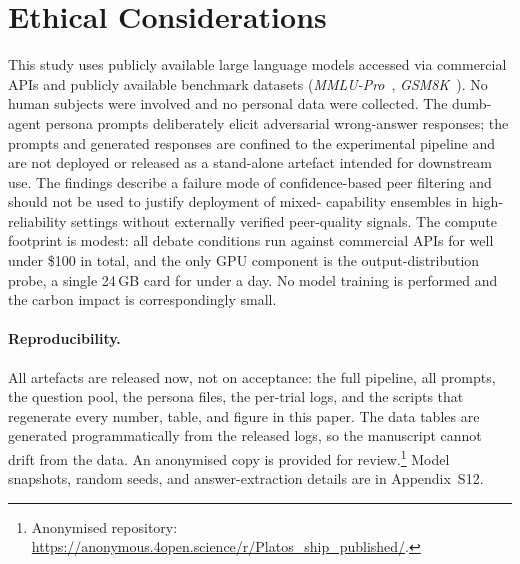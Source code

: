 \documentclass[11pt]{article}
\begin{document}
\section*{Ethical Considerations}
\label{sec:ethics}

This study uses publicly available large language models accessed via
commercial APIs and publicly available benchmark datasets
(\textit{MMLU-Pro}~\citep{wang2024mmlupro},
\textit{GSM8K}~\citep{cobbe2021training}).
No human subjects were involved and no personal data were collected.
The dumb-agent persona prompts deliberately elicit adversarial
wrong-answer responses; the prompts and generated responses are
confined to the experimental pipeline and are not deployed or released
as a stand-alone artefact intended for downstream use.
The findings describe a failure mode of confidence-based peer
filtering and should not be used to justify deployment of mixed-
capability ensembles in high-reliability settings without externally
verified peer-quality signals.
The compute footprint is modest: all debate conditions run against commercial
APIs for well under \$100 in total, and the only GPU component is the
output-distribution probe, a single 24\,GB card for under a day.
No model training is performed and the carbon impact is correspondingly small.

\paragraph{Reproducibility.}
\label{sec:repro}
All artefacts are released now, not on acceptance: the full pipeline, all
prompts, the question pool, the persona files, the per-trial logs, and the
scripts that regenerate every number, table, and figure in this paper.
The data tables are generated programmatically from the released logs, so the
manuscript cannot drift from the data.
An anonymised copy is provided for review.\footnote{Anonymised repository:
\url{https://anonymous.4open.science/r/Platos_ship_published/}.}
Model snapshots, random seeds, and answer-extraction details are in
Appendix~S12.

%
\end{document}
